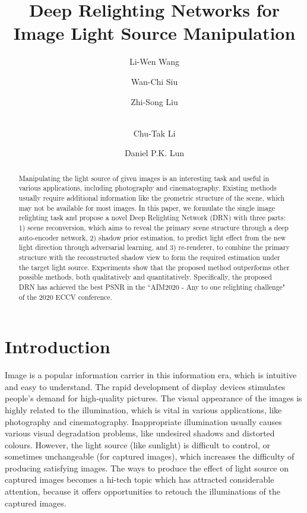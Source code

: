 \documentclass[runningheads]{llncs}
\begin{document}
\pagestyle{headings}
\mainmatter
\def\ECCVSubNumber{96}  

\title{Deep Relighting Networks for Image Light Source Manipulation} 



\author{Li-Wen Wang\and
Wan-Chi Siu \and
Zhi-Song Liu \and\\
Chu-Tak Li \and
Daniel P.K. Lun
}
\baselineskip
{}
\maketitle
\vskip -0.6cm
\baselineskip 
\begin{abstract}
Manipulating the light source of given images is an interesting task and useful in various applications, including photography and cinematography. Existing methods usually require additional information like the geometric structure of the scene, which may not be available for most images. In this paper, we formulate the single image relighting task and propose a novel Deep Relighting Network (DRN) with three parts: 1) scene reconversion, which aims to reveal the primary scene structure through a deep auto-encoder network, 2) shadow prior estimation, to predict light effect from the new light direction through adversarial learning, and 3) re-renderer, to combine the primary structure with the reconstructed shadow view to form the required estimation under the target light source. Experiments show that the proposed method outperforms other possible methods, both qualitatively and quantitatively. Specifically, the proposed DRN has achieved the best PSNR in the “AIM2020 - Any to one relighting challenge" of the 2020 ECCV conference.
 

\end{abstract}
\vskip -1cm
\baselineskip 
\section{Introduction}
\baselineskip 
Image is a popular information carrier in this information era, which is intuitive and easy to understand. The rapid development of display devices stimulates people's demand for high-quality pictures. The visual appearance of the images is highly related to the illumination, which is vital in various applications, like photography and cinematography. Inappropriate illumination usually causes various visual degradation problems, like undesired shadows and distorted colours. However, the light source (like sunlight) is difficult to control, or sometimes unchangeable (for captured images), which increases the difficulty of producing satisfying images.  The ways to produce the effect of light source on captured images becomes a hi-tech topic which has attracted considerable attention, because it offers opportunities to retouch the illuminations of the captured images.  
\end{document}
